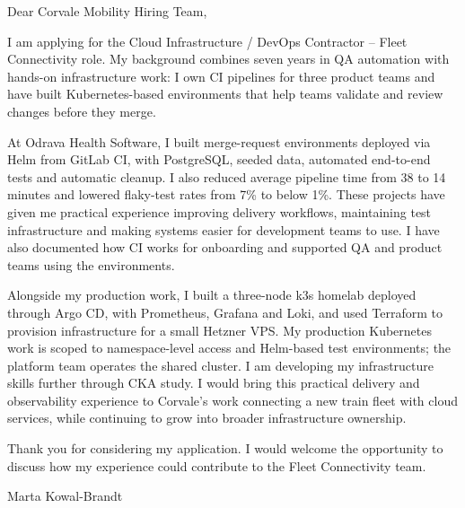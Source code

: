 \documentclass[11pt,a4paper]{article}
\begin{document}
Dear Corvale Mobility Hiring Team,

I am applying for the Cloud Infrastructure / DevOps Contractor -- Fleet Connectivity role. My background combines seven years in QA automation with hands-on infrastructure work: I own CI pipelines for three product teams and have built Kubernetes-based environments that help teams validate and review changes before they merge.

At Odrava Health Software, I built merge-request environments deployed via Helm from GitLab CI, with PostgreSQL, seeded data, automated end-to-end tests and automatic cleanup. I also reduced average pipeline time from 38 to 14 minutes and lowered flaky-test rates from 7\% to below 1\%. These projects have given me practical experience improving delivery workflows, maintaining test infrastructure and making systems easier for development teams to use. I have also documented how CI works for onboarding and supported QA and product teams using the environments.

Alongside my production work, I built a three-node k3s homelab deployed through Argo CD, with Prometheus, Grafana and Loki, and used Terraform to provision infrastructure for a small Hetzner VPS. My production Kubernetes work is scoped to namespace-level access and Helm-based test environments; the platform team operates the shared cluster. I am developing my infrastructure skills further through CKA study. I would bring this practical delivery and observability experience to Corvale's work connecting a new train fleet with cloud services, while continuing to grow into broader infrastructure ownership.

Thank you for considering my application. I would welcome the opportunity to discuss how my experience could contribute to the Fleet Connectivity team.

\textcolor{headingcolor}{Marta Kowal-Brandt}
\end{document}
